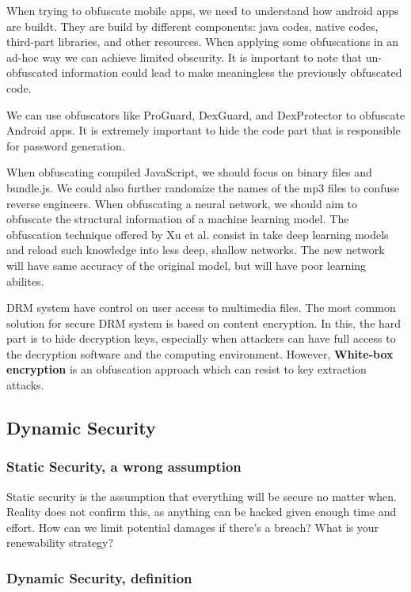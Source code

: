 When trying to obfuscate mobile apps, we need to understand how android apps are buildt. They are build by different components: java codes, native codes, third-part libraries, and other resources. 
When applying some obfuscations in an ad-hoc way we can achieve limited obscurity.
It is important to note that un-obfuscated information could lead to make meaningless the previously obfuscated code. 

We can use obfuscators like ProGuard, DexGuard, and DexProtector to obfuscate Android apps. It is extremely important to hide the code part that is responsible for password generation. 
\par 
When obfuscating compiled JavaScript, we should focus on binary files and bundle.js. We could also further randomize the names of the mp3 files to confuse reverse engineers. 
When obfuscating a neural network, we should aim to obfuscate the structural information of a machine learning model. The obfuscation technique offered by Xu et al. consist in take deep learning models and reload such knowledge into less deep, shallow networks.
The new network will have same accuracy of the original model, but will have poor learning abilites. 
\par 
DRM system have control on user access to multimedia files. 
The most common solution for secure DRM system is based on content encryption. In this, the hard part is to hide decryption keys, especially when attackers can have full access to the decryption software and the computing environment. 
However, \textbf{White-box encryption} is an obfuscation approach which can resist to key extraction attacks. 

\subsection{Dynamic Security}

\subsubsection{Static Security, a wrong assumption}

Static security is the assumption that everything will be secure no matter when. Reality does not confirm this, as anything can be hacked given enough time and effort. 
How can we limit potential damages if there's a breach?
What is your renewability strategy? 

\subsubsection{Dynamic Security, definition}

